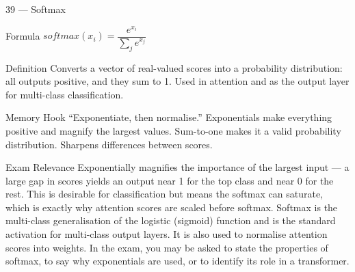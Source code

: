 \documentclass[aspectratio=169,8pt]{beamer}
\begin{document}
	\begin{frame}{39 --- Softmax}
		\begin{block}{Formula}
			$softmax(x_i) = \dfrac{e^{x_i}}{\sum_j e^{x_j}}$
		\end{block}
		\begin{block}{Definition}
			Converts a vector of real-valued scores into a probability distribution: all outputs positive, and they sum to 1. Used in attention and as the output layer for multi-class classification.
		\end{block}
		\begin{block}{Memory Hook}
			``Exponentiate, then normalise.'' Exponentials make everything positive and magnify the largest values. Sum-to-one makes it a valid probability distribution. Sharpens differences between scores.
		\end{block}
		\begin{block}{Exam Relevance}
			Exponentially magnifies the importance of the largest input --- a large gap in scores yields an output near 1 for the top class and near 0 for the rest. This is desirable for classification but means the softmax can saturate, which is exactly why attention scores are scaled before softmax. Softmax is the multi-class generalisation of the logistic (sigmoid) function and is the standard activation for multi-class output layers. It is also used to normalise attention scores into weights. In the exam, you may be asked to state the properties of softmax, to say why exponentials are used, or to identify its role in a transformer.
		\end{block}
	\end{frame}
	
\end{document}
